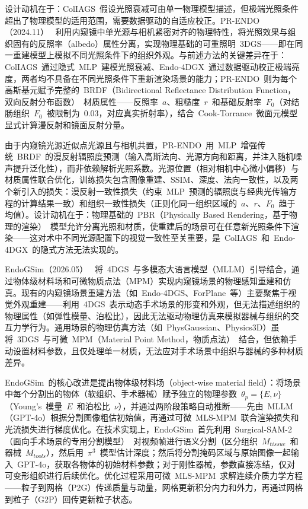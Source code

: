 设计动机在于：ColIAGS~假设光照衰减可由单一物理模型描述，但极端光照条件超出了物理模型的适用范围，需要数据驱动的自适应校正。PR-ENDO（2024.11）~\cite{2411_12510} 利用内窥镜中单光源与相机紧密对齐的物理特性，将光照效果与组织固有的反照率（albedo）属性分离，实现物理基础的可重照明~3DGS——即在同一重建模型上模拟不同光照条件下的组织外观。与前述方法的关键差异在于：ColIAGS~通过隐式~MLP~建模光照衰减、Endo-4DGX~通过数据驱动校正极端亮度，两者均不具备在不同光照条件下重新渲染场景的能力；PR-ENDO~则为每个高斯基元赋予完整的~BRDF（Bidirectional Reflectance Distribution Function，双向反射分布函数）~材质属性——反照率~$a$、粗糙度~$r$~和基础反射率~$F_0$（对结肠组织~$F_0$~被限制为~0.03，对应真实折射率），结合~Cook-Torrance~微面元模型显式计算漫反射和镜面反射分量。

由于内窥镜光源近似点光源且与相机共置，PR-ENDO~用~MLP~增强传统~BRDF~的漫反射辐照度预测（输入高斯法向、光源方向和距离，并注入随机噪声提升泛化性），而非依赖解析光照系数。光源位置（相对相机中心微小偏移）与材质属性联合优化，训练损失包含图像重建、SSIM、深度、法向一致性，以及两个新引入的损失：漫反射一致性损失（约束~MLP~预测的辐照度与经典光传输方程的计算结果一致）和组织一致性损失（正则化同一组织区域的~$a$、$r$、$F_0$~趋于均值）。设计动机在于：物理基础的~PBR（Physically Based Rendering，基于物理的渲染）~模型允许分离光照和材质，使重建后的场景可在任意新光照条件下渲染——这对术中不同光源配置下的视觉一致性至关重要，是~ColIAGS~和~Endo-4DGX~的隐式方法无法实现的。

EndoGSim（2026.05）~\cite{2605_16022} 将~4DGS~与多模态大语言模型（MLLM）引导结合，通过物体级材料场和可微物质点法（MPM）实现内窥镜场景的物理感知重建和仿真。现有的内窥镜场景重建方法（如~Endo-4DGS、ForPlane~等）主要聚焦于视觉外观重建——利用~4DGS~表示动态手术场景的形变和外观，但无法描述组织的物理属性（如弹性模量、泊松比），因此无法驱动物理仿真来模拟器械与组织的交互力学行为。通用场景的物理仿真方法（如~PhysGaussian、Physics3D）虽将~3DGS~与可微~MPM（Material Point Method，物质点法）~结合，但依赖手动设置材料参数，且仅处理单一材质，无法应对手术场景中组织与器械的多种材质差异。

EndoGSim~的核心改进是提出物体级材料场（object-wise material field）：将场景中每个分割出的物体（软组织、手术器械）赋予独立的物理参数~$\theta_p = \{E, \nu\}$（Young's~模量~$E$~和泊松比~$\nu$），并通过两阶段策略自动推断——先由~MLLM（GPT-4o）根据分割图像粗估初始值，再通过可微~MLS-MPM~联合渲染损失和光流损失进行梯度优化。在技术实现上，EndoGSim~首先利用~Surgical-SAM-2（面向手术场景的专用分割模型）~对视频帧进行语义分割（区分组织~$M_{tissue}$~和器械~$M_{tools}$），然后用~$\pi^3$~模型估计深度；然后将分割掩码区域与原始图像一起输入~GPT-4o，获取各物体的初始材料参数；对于刚性器械，参数直接冻结，仅对可变形组织进行后续优化。优化过程采用可微~MLS-MPM~求解连续介质力学方程——粒子到网格（P2G）传递质量与动量，网格更新积分内力和外力，再通过网格到粒子（G2P）回传更新粒子状态。

